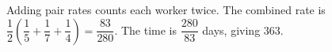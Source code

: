Adding pair rates counts each worker twice. The combined rate is $\dfrac{1}{2}\left(\dfrac{1}{5}+\dfrac{1}{7}+\dfrac{1}{4}\right)=\dfrac{83}{280}$. The time is $\dfrac{280}{83}$ days, giving $\boxed{363}$.
